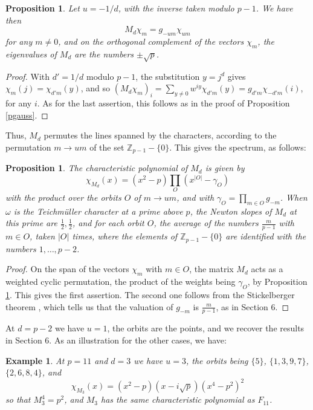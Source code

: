 \documentclass[11pt]{amsart}
\newtheorem{proposition}[theorem]{Proposition}
\newtheorem{example}[theorem]{Example}
\theoremstyle{definition}
\begin{document}
\begin{proposition}\label{ppow}
Let $u=-1/d$, with the inverse taken modulo $p-1$. We have then
$$M_d\chi_m=g_{-um}\chi_{um}$$
for any $m\neq0$, and on the orthogonal complement of the vectors $\chi_m$, the eigenvalues of $M_d$ are the numbers $\pm\sqrt{p}$.
\end{proposition}

\begin{proof}
With $d'=1/d$ modulo $p-1$, the substitution $y=j^d$ gives $\chi_m(j)=\chi_{d'm}(y)$, and so $(M_d\chi_m)_i=\sum_{y\neq0}w^{iy}\chi_{d'm}(y)=g_{d'm}\chi_{-d'm}(i)$, for any $i$. As for the last assertion, this follows as in the proof of Proposition \ref{pgauss}.
\end{proof}

Thus, $M_d$ permutes the lines spanned by the characters, according to the permutation $m\to um$ of the set $\mathbb Z_{p-1}-\{0\}$. This gives the spectrum, as follows:

\begin{proposition}\label{pspec}
The characteristic polynomial of $M_d$ is given by
$$\chi_{M_d}(x)=(x^2-p)\prod_O(x^{|O|}-\gamma_O)$$
with the product over the orbits $O$ of $m\to um$, and with $\gamma_O=\prod_{m\in O}g_{-m}$. When $\omega$ is the Teichm\"uller character at a prime above $p$, the Newton slopes of $M_d$ at this prime are $\frac{1}{2},\frac{1}{2}$, and for each orbit $O$, the average of the numbers $\frac{m}{p-1}$ with $m\in O$, taken $|O|$ times, where the elements of $\mathbb Z_{p-1}-\{0\}$ are identified with the numbers $1,\ldots,p-2$.
\end{proposition}

\begin{proof}
On the span of the vectors $\chi_m$ with $m\in O$, the matrix $M_d$ acts as a weighted cyclic permutation, the product of the weights being $\gamma_O$, by Proposition \ref{ppow}. This gives the first assertion. The second one follows from the Stickelberger theorem \cite{sti}, which tells us that the valuation of $g_{-m}$ is $\frac{m}{p-1}$, as in Section 6.
\end{proof}

At $d=p-2$ we have $u=1$, the orbits are the points, and we recover the results in Section 6. As an illustration for the other cases, we have:

\begin{example}\label{eele}
At $p=11$ and $d=3$ we have $u=3$, the orbits being $\{5\}$, $\{1,3,9,7\}$, $\{2,6,8,4\}$, and
$$\chi_{M_3}(x)=(x^2-p)(x-i\sqrt{p})(x^4-p^2)^2$$
so that $M_3^4=p^2$, and $M_3$ has the same characteristic polynomial as $F_{11}$.
\end{example}
\end{document}
